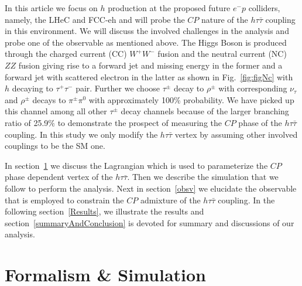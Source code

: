 \documentclass[pdftex,twocolumn,epjc3]{svjour3}          %
\begin{document}
In this article we focus on $h$ production at the proposed future $e^- p$ colliders, namely, the LHeC and FCC-eh and will probe the $CP$ nature of the $h\tau{\bar\tau}$ coupling in this environment. We will discuss the involved challenges in the analysis and probe one of the observable as mentioned above. The Higgs Boson is produced through the charged current (CC) $W^+W^-$ fusion and the neutral current (NC) $ZZ$ fusion giving rise to a forward jet and missing energy in the former and a forward jet with scattered electron in the latter as shown in Fig.~\ref{fig:figNc} with $h$ decaying to $\tau^+ \tau^-$ pair. Further we choose $\tau^\pm$ decay to $\rho^\pm$ with corresponding $\nu_\tau$ and $\rho^\pm$ decays to $\pi^\pm \pi^0$ with approximately 100\% probability.
We have picked up this channel among all other $\tau^\pm$ decay channels because of the larger branching ratio of 25.9$\%$ to demonstrate the prospect of measuring the $CP$ phase of the $h\tau{\bar\tau}$ coupling.
In this study we only modify the $h\tau{\bar\tau}$ vertex by assuming other involved couplings to be the SM one. 

In section~\ref{sec2:TheorysetUpAndSimulation} we discuss the Lagrangian which is used to parameterize the $CP$ phase dependent vertex of the $h\tau{\bar\tau}$. Then we describe the simulation that we follow to perform the analysis. Next in section~\ref{obsv} we elucidate the observable that is employed to constrain the $CP$ admixture of the $h\tau{\bar\tau}$ coupling. In the following section~\ref{Results}, we illustrate the results and section~\ref{summaryAndConclusion} is devoted for summary and discussions of our analysis.

\section{Formalism \& Simulation}
\label{sec2:TheorysetUpAndSimulation}
\end{document}
